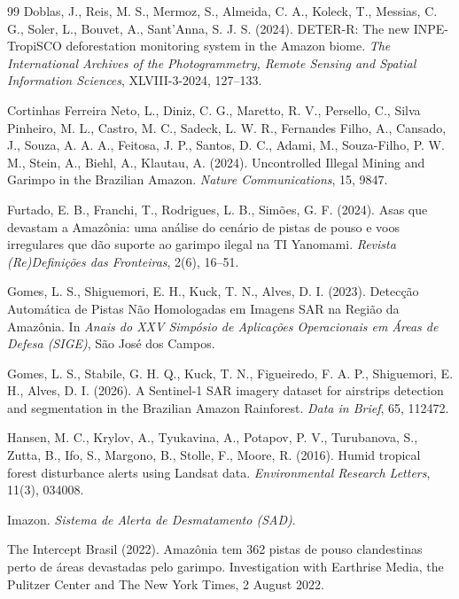 \documentclass[11pt]{article}
\begin{document}
\begin{thebibliography}{99}
Doblas, J., Reis, M. S., Mermoz, S., Almeida, C. A., Koleck, T., Messias, C. G., Soler, L., Bouvet, A., Sant'Anna, S. J. S. (2024).
DETER-R: The new INPE-TropiSCO deforestation monitoring system in the Amazon biome.
\textit{The International Archives of the Photogrammetry, Remote Sensing and Spatial Information Sciences}, XLVIII-3-2024, 127--133.

Cortinhas Ferreira Neto, L., Diniz, C. G., Maretto, R. V., Persello, C., Silva Pinheiro, M. L., Castro, M. C., Sadeck, L. W. R., Fernandes Filho, A., Cansado, J., Souza, A. A. A., Feitosa, J. P., Santos, D. C., Adami, M., Souza-Filho, P. W. M., Stein, A., Biehl, A., Klautau, A. (2024).
Uncontrolled Illegal Mining and Garimpo in the Brazilian Amazon.
\textit{Nature Communications}, 15, 9847.

Furtado, E. B., Franchi, T., Rodrigues, L. B., Sim\~oes, G. F. (2024).
Asas que devastam a Amaz\^onia: uma an\'alise do cen\'ario de pistas de pouso e voos irregulares que d\~ao suporte ao garimpo ilegal na TI Yanomami.
\textit{Revista (Re)Defini\c{c}\~oes das Fronteiras}, 2(6), 16--51.

Gomes, L. S., Shiguemori, E. H., Kuck, T. N., Alves, D. I. (2023).
Detec\c{c}\~ao Autom\'atica de Pistas N\~ao Homologadas em Imagens SAR na Regi\~ao da Amaz\^onia.
In \textit{Anais do XXV Simp\'osio de Aplica\c{c}\~oes Operacionais em \'Areas de Defesa (SIGE)}, S\~ao Jos\'e dos Campos.

Gomes, L. S., Stabile, G. H. Q., Kuck, T. N., Figueiredo, F. A. P., Shiguemori, E. H., Alves, D. I. (2026).
A Sentinel-1 SAR imagery dataset for airstrips detection and segmentation in the Brazilian Amazon Rainforest.
\textit{Data in Brief}, 65, 112472.

Hansen, M. C., Krylov, A., Tyukavina, A., Potapov, P. V., Turubanova, S., Zutta, B., Ifo, S., Margono, B., Stolle, F., Moore, R. (2016).
Humid tropical forest disturbance alerts using Landsat data.
\textit{Environmental Research Letters}, 11(3), 034008.

Imazon.
\textit{Sistema de Alerta de Desmatamento (SAD)}.

The Intercept Brasil (2022).
Amaz\^onia tem 362 pistas de pouso clandestinas perto de \'areas devastadas pelo garimpo.
Investigation with Earthrise Media, the Pulitzer Center and The New York Times, 2 August 2022.


\end{thebibliography}
\end{document}
